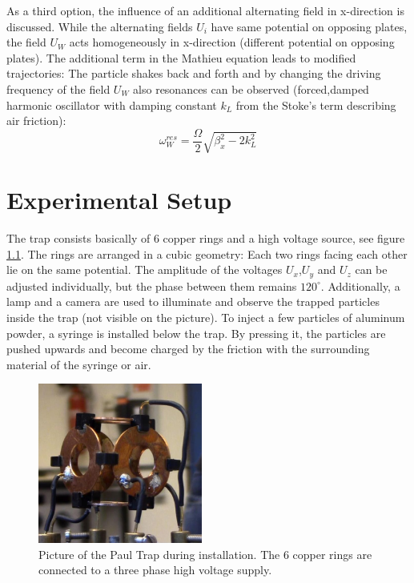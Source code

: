 \documentclass[
	paper=A4,
	parskip=full,
	chapterprefix=true,
	11pt,
	headings=normal,
	bibliography=totoc,
	listof=totoc,
	titlepage=on,
]{scrreprt}
\newcommand{\halfwidth}{0.48\textwidth}
\begin{document}
As a third option, the influence of an additional alternating field in x-direction is discussed. While the alternating fields $U_i$ have same potential on opposing plates, the field $U_W$ acts homogeneously in x-direction (different potential on opposing plates). The additional term in the Mathieu equation leads to modified trajectories: The particle shakes back and forth and by changing the driving frequency of the field $U_W$ also resonances can be observed (forced,damped harmonic oscillator with damping constant $k_L$ from the Stoke's term describing air friction):
\begin{equation}
\omega_W^{res} = \frac{\Omega}{2} \sqrt{\beta_x^2 - 2 k_L^2}
\end{equation}



\chapter{Experimental Setup}

The trap consists basically of 6 copper rings and a high voltage source, see figure \ref{fig:trap}. The rings are arranged in a cubic geometry: Each two rings facing each other lie on the same potential. The amplitude of the voltages $U_x$,$U_y$ and $U_z$ can be adjusted individually, but the phase between them remains $120^\circ$. Additionally, a lamp and a camera are used to illuminate and observe the trapped particles inside the trap (not visible on the picture). To inject a few particles of aluminum powder, a syringe is installed below the trap. By pressing it, the particles are pushed upwards and become charged by the friction with the surrounding material of the syringe or air. \\

\begin{figure}
	\centering
	\includegraphics[width=\halfwidth]{capture_20150916_124003_cut}
	\caption{Picture of the Paul Trap during installation. The 6 copper rings are connected to a three phase high voltage supply.}
	\label{fig:trap}
\end{figure}
\end{document}
